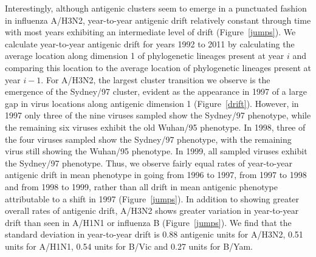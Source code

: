 \documentclass[11pt,oneside,letterpaper]{article}
\begin{document}
Interestingly, although antigenic clusters seem to emerge in a punctuated fashion in influenza A/H3N2, year-to-year antigenic drift relatively constant through time with most years exhibiting an intermediate level of drift (Figure~\ref{jumps}).
We calculate year-to-year antigenic drift for years 1992 to 2011 by calculating the average location along dimension 1 of phylogenetic lineages present at year $i$ and comparing this location to the average location of phylogenetic lineages present at year $i-1$.
For A/H3N2, the largest cluster transition we observe is the emergence of the Sydney/97 cluster, evident as the appearance in 1997 of a large gap in virus locations along antigenic dimension 1 (Figure~\ref{drift}).
However, in 1997 only three of the nine viruses sampled show the Sydney/97 phenotype, while the remaining six viruses exhibit the old Wuhan/95 phenotype.
In 1998, three of the four viruses sampled show the Sydney/97 phenotype, with the remaining virus still showing the Wuhan/95 phenotype.
In 1999, all sampled viruses exhibit the Sydney/97 phenotype.
Thus, we observe fairly equal rates of year-to-year antigenic drift in mean phenotype in going from 1996 to 1997, from 1997 to 1998 and from 1998 to 1999, rather than all drift in mean antigenic phenotype attributable to a shift in 1997 (Figure~\ref{jumps}).
In addition to showing greater overall rates of antigenic drift, A/H3N2 shows greater variation in year-to-year drift than seen in A/H1N1 or influenza B (Figure~\ref{jumps}).
We find that the standard deviation in year-to-year drift is 0.88 antigenic units for A/H3N2, 0.51 units for A/H1N1, 0.54 units for B/Vic and 0.27 units for B/Yam.
\end{document}
